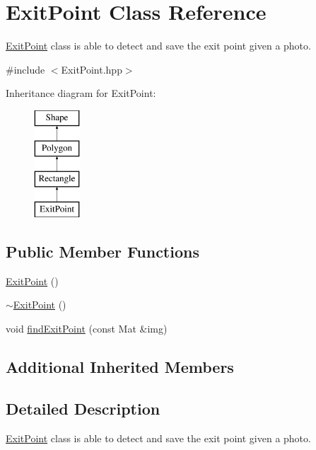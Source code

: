 \hypertarget{class_exit_point}{}\section{Exit\+Point Class Reference}
\label{class_exit_point}


\mbox{\hyperlink{class_exit_point}{Exit\+Point}} class is able to detect and save the exit point given a photo.  




{\ttfamily \#include $<$Exit\+Point.\+hpp$>$}

Inheritance diagram for Exit\+Point\+:\begin{figure}[H]
\begin{center}
\leavevmode
\includegraphics[height=4.000000cm]{class_exit_point}
\end{center}
\end{figure}
\subsection*{Public Member Functions}
\begin{DoxyCompactItemize}
\item 
\mbox{\hyperlink{class_exit_point_ae472f935e952356c9bfe64298474d523}{Exit\+Point}} ()
\item 
\mbox{\hyperlink{class_exit_point_aa764fee5b37cb7dbda6f2fde39ffbc05}{$\sim$\+Exit\+Point}} ()
\item 
void \mbox{\hyperlink{class_exit_point_a2762c0c61bbe71a1a292b86e9517e860}{find\+Exit\+Point}} (const Mat \&img)
\end{DoxyCompactItemize}
\subsection*{Additional Inherited Members}


\subsection{Detailed Description}
\mbox{\hyperlink{class_exit_point}{Exit\+Point}} class is able to detect and save the exit point given a photo. 


